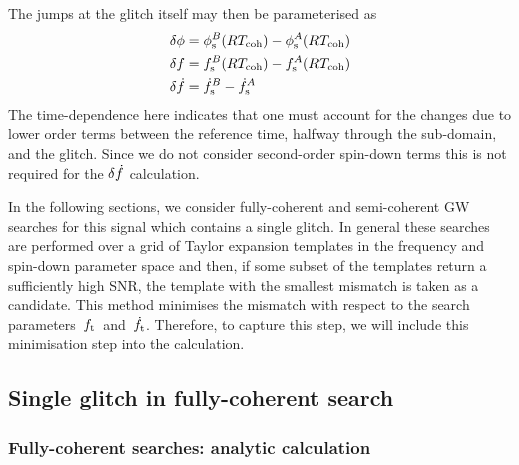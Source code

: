 \documentclass[../full_thesis/full_thesis.tex]{subfiles}
\begin{document}
The jumps at the glitch itself may then be parameterised as
\begin{align}
\begin{split}
\delta\phi & =  \phi_{\textrm{s}}^{B}(RT_{\mathrm{coh}}) - \phi_{\textrm{s}}^{A}(RT_{\mathrm{coh}})\\
\delta f & =  f_{\textrm{s}}^{B}(RT_{\mathrm{coh}}) - f_{\textrm{s}}^{A}(RT_{\mathrm{coh}})\\
\delta\dot{f} & =  \dot{f}_{\textrm{s}}^{B} - \dot{f}_{\textrm{s}}^{A}
\end{split}
\label{eqn: glitch jumps}
\end{align}
The time-dependence here indicates that one must account for the
changes due to lower order terms between the reference time, halfway through
the sub-domain, and the glitch. Since we do not consider second-order spin-down
terms this is not required for the $\delta\dot{f}$ calculation.

In the following sections, we consider fully-coherent and semi-coherent GW
searches for this signal which contains a single glitch. In general these
searches are performed over a grid of Taylor expansion templates in the
frequency and spin-down parameter space and then, if some subset of the
templates return a sufficiently high SNR, the template with the smallest
mismatch is taken as a candidate. This method minimises the mismatch with
respect to the search parameters~${f_{\textrm{t}}}$~and~$\dot{f}_{\textrm{t}}$. Therefore, to capture
this step, we will include this minimisation step into the calculation.

\subsection{Single glitch in fully-coherent search}

\subsubsection{Fully-coherent searches: analytic calculation}
\end{document}
